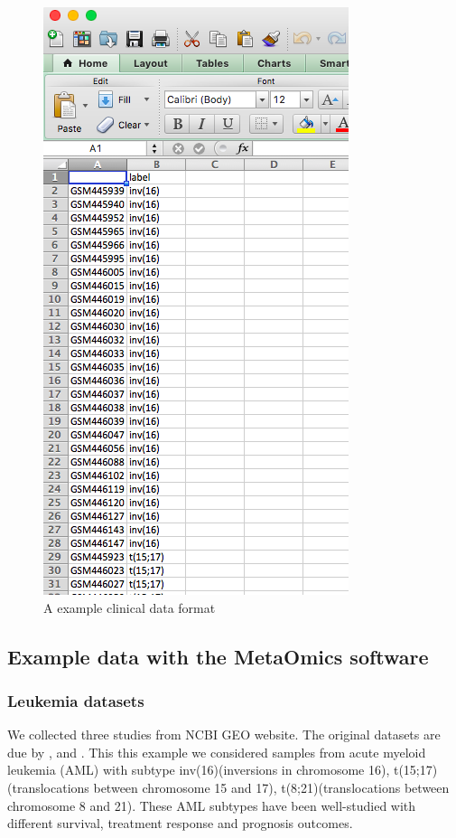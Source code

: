\begin{figure}[H]
\begin{center}
\includegraphics[scale=0.5]{./figure/dataPreparation/clinicalData}
\caption{A example clinical data format}
\label{fig:clinical}
\end{center}
\end{figure}

\subsection{Example data with the MetaOmics software}

\subsubsection{Leukemia datasets}

We collected three studies from NCBI GEO website.   
The original datasets are due by \cite{verhaak2009prediction}, \cite{balgobind2011evaluation} and \cite{kohlmann2008international}.	
This this example we  considered samples from acute myeloid leukemia (AML) with subtype 
	inv(16)(inversions in chromosome 16), 
	t(15;17)(translocations between chromosome 15 and 17), 
	t(8;21)(translocations between chromosome 8 and 21).
	These AML subtypes have been well-studied with different survival, 
	treatment response and prognosis outcomes.
	

